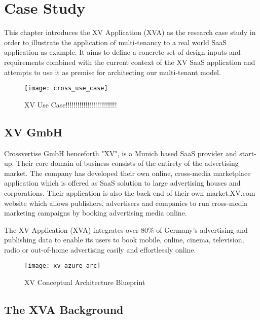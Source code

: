 \chapter{Case Study}

This chapter introduces the XV Application (XVA) as the research case study in order to illustrate the application of multi-tenancy to a real world SaaS application as example. It aims to define a concrete set of design inputs and requirements combined with the current context of the XV SaaS application and attempts to use it as premise for architecting our multi-tenant model.

\begin{figure}
\centering
\texttt{[image: cross\_use\_case]}
\caption{XV Use Case!!!!!!!!!!!!!!!!!!!!!!!!!!}
\label{fig:cross_use_case}
\end{figure}

\section{XV GmbH}

Crossvertise GmbH henceforth "XV", is a Munich based SaaS provider and start-up. Their core domain of business consists of the entirety of the advertising market. The company has developed their own online, cross-media marketplace application which is offered as SaaS solution to large advertising houses and corporations. Their application is also the back end of their own market.XV.com website which allows publishers, advertisers and companies to run cross-media marketing campaigns by booking advertising media online.
 
The XV Application (XVA) integrates over 80\% of Germany's advertising and publishing data to enable its users to book mobile, online, cinema, television, radio or out-of-home advertising easily and effortlessly online.

\begin{figure}
\centering
\texttt{[image: xv\_azure\_arc]}
\caption{XV Conceptual Architecture Blueprint}
\label{fig:xv_azure_arc}
\end{figure}

\section{The XVA Background}

